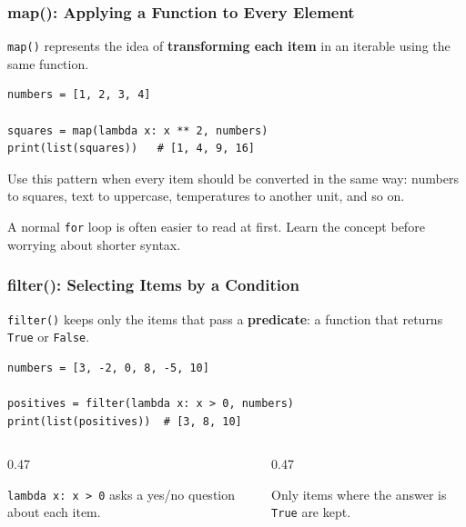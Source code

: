 \documentclass[aspectratio=169,10pt]{beamer}
\newcommand{\keyword}[1]{\textcolor{PrimaryBlue}{\textbf{#1}}}
\newcommand{\codeword}[1]{\texttt{#1}}
\begin{document}
\begin{frame}[fragile]
\frametitle{map(): Applying a Function to Every Element}
\small
\codeword{map()} represents the idea of \keyword{transforming each item} in an iterable using the same function.

\vspace{0.18cm}
\begin{lstlisting}[style=pycode]
numbers = [1, 2, 3, 4]

squares = map(lambda x: x ** 2, numbers)
print(list(squares))   # [1, 4, 9, 16]
\end{lstlisting}

\begin{tcolorbox}[lecturebox,title=Key idea]
Use this pattern when every item should be converted in the same way: numbers to squares, text to uppercase, temperatures to another unit, and so on.
\end{tcolorbox}

\vspace{0.1cm}
\begin{tcolorbox}[lecturebox,title=Beginner note]
A normal \codeword{for} loop is often easier to read at first. Learn the concept before worrying about shorter syntax.
\end{tcolorbox}
\end{frame}

\begin{frame}[fragile]
\frametitle{filter(): Selecting Items by a Condition}
\small
\codeword{filter()} keeps only the items that pass a \keyword{predicate}: a function that returns \codeword{True} or \codeword{False}.

\vspace{0.18cm}
\begin{lstlisting}[style=pycode]
numbers = [3, -2, 0, 8, -5, 10]

positives = filter(lambda x: x > 0, numbers)
print(list(positives))  # [3, 8, 10]
\end{lstlisting}

\begin{columns}[T,totalwidth=0.96\textwidth]
\begin{column}{0.47\textwidth}
\begin{tcolorbox}[lecturebox,title=Predicate]
\codeword{lambda x: x > 0} asks a yes/no question about each item.
\end{tcolorbox}
\end{column}
\begin{column}{0.47\textwidth}
\begin{tcolorbox}[lecturebox,title=Result]
Only items where the answer is \codeword{True} are kept.
\end{tcolorbox}
\end{column}
\end{columns}
\end{frame}
\end{document}
